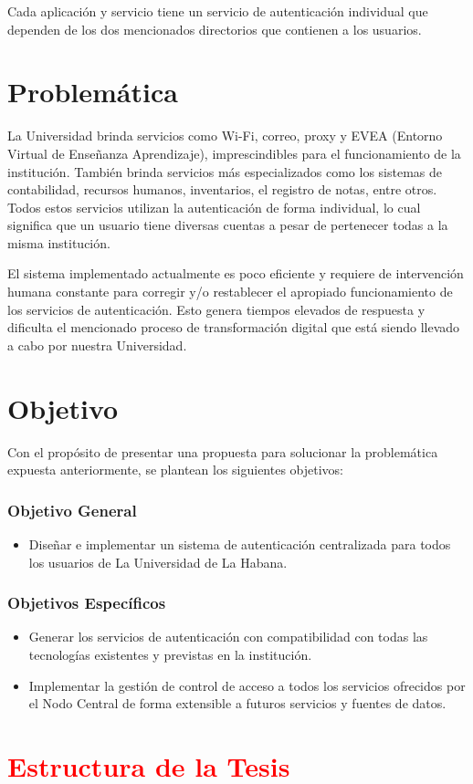 Cada aplicación y servicio tiene un servicio de autenticación individual que dependen de los dos mencionados directorios que contienen a los usuarios.

\section*{Problemática}
La Universidad brinda servicios como Wi-Fi, correo, proxy y EVEA (Entorno Virtual de Enseñanza Aprendizaje), imprescindibles para el funcionamiento de la institución. También brinda servicios más especializados como los sistemas de contabilidad, recursos humanos, inventarios, el registro de notas, entre otros. Todos estos servicios utilizan la autenticación de forma individual, lo cual significa que un usuario tiene diversas cuentas a pesar de pertenecer todas a la misma institución.

El sistema implementado actualmente es poco eficiente y requiere de intervención humana constante para corregir y/o restablecer el apropiado funcionamiento de los servicios de autenticación. Esto genera tiempos elevados de respuesta y dificulta el mencionado proceso de transformación digital que está siendo llevado a cabo por nuestra Universidad.

\section*{Objetivo}
Con el propósito de presentar una propuesta para solucionar la problemática expuesta anteriormente, se plantean los siguientes objetivos:

\subsubsection*{Objetivo General}

\begin{itemize}	
	\item Diseñar e implementar un sistema de autenticación centralizada para todos los usuarios de La Universidad de La Habana. 
\end{itemize}

\subsubsection*{Objetivos Específicos}
\begin{itemize}	
	\item Generar los servicios de autenticación con compatibilidad con todas las tecnologías existentes y previstas en la institución.
	\item Implementar la gestión de control de acceso a todos los servicios ofrecidos por el Nodo Central de forma extensible a futuros servicios y fuentes de datos.
\end{itemize}

\section*{\textcolor{red}{Estructura de la Tesis}}
